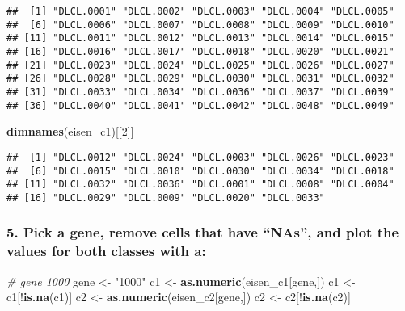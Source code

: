 \documentclass[]{article}
\newenvironment{Shaded}{\begin{snugshade}}{\end{snugshade}}
\newcommand{\KeywordTok}[1]{\textcolor[rgb]{0.13,0.29,0.53}{\textbf{{#1}}}}
\newcommand{\DecValTok}[1]{\textcolor[rgb]{0.00,0.00,0.81}{{#1}}}
\newcommand{\StringTok}[1]{\textcolor[rgb]{0.31,0.60,0.02}{{#1}}}
\newcommand{\CommentTok}[1]{\textcolor[rgb]{0.56,0.35,0.01}{\textit{{#1}}}}
\newcommand{\NormalTok}[1]{{#1}}
\begin{document}
\begin{verbatim}
##  [1] "DLCL.0001" "DLCL.0002" "DLCL.0003" "DLCL.0004" "DLCL.0005"
##  [6] "DLCL.0006" "DLCL.0007" "DLCL.0008" "DLCL.0009" "DLCL.0010"
## [11] "DLCL.0011" "DLCL.0012" "DLCL.0013" "DLCL.0014" "DLCL.0015"
## [16] "DLCL.0016" "DLCL.0017" "DLCL.0018" "DLCL.0020" "DLCL.0021"
## [21] "DLCL.0023" "DLCL.0024" "DLCL.0025" "DLCL.0026" "DLCL.0027"
## [26] "DLCL.0028" "DLCL.0029" "DLCL.0030" "DLCL.0031" "DLCL.0032"
## [31] "DLCL.0033" "DLCL.0034" "DLCL.0036" "DLCL.0037" "DLCL.0039"
## [36] "DLCL.0040" "DLCL.0041" "DLCL.0042" "DLCL.0048" "DLCL.0049"
\end{verbatim}

\begin{Shaded}
\begin{Highlighting}[]
\KeywordTok{dimnames}\NormalTok{(eisen_c1)[[}\DecValTok{2}\NormalTok{]]}
\end{Highlighting}
\end{Shaded}

\begin{verbatim}
##  [1] "DLCL.0012" "DLCL.0024" "DLCL.0003" "DLCL.0026" "DLCL.0023"
##  [6] "DLCL.0015" "DLCL.0010" "DLCL.0030" "DLCL.0034" "DLCL.0018"
## [11] "DLCL.0032" "DLCL.0036" "DLCL.0001" "DLCL.0008" "DLCL.0004"
## [16] "DLCL.0029" "DLCL.0009" "DLCL.0020" "DLCL.0033"
\end{verbatim}

\subsubsection{\texorpdfstring{5. Pick a gene, remove cells that have
``NAs'', and plot the values for both classes with
a:}{5. Pick a gene, remove cells that have NAs, and plot the values for both classes with a:}}\label{pick-a-gene-remove-cells-that-have-nas-and-plot-the-values-for-both-classes-with-a}

\begin{Shaded}
\begin{Highlighting}[]
\CommentTok{# gene 1000}
\NormalTok{gene <-}\StringTok{ "1000"}
\NormalTok{c1 <-}\StringTok{ }\KeywordTok{as.numeric}\NormalTok{(eisen_c1[gene,])}
\NormalTok{c1 <-}\StringTok{ }\NormalTok{c1[!}\KeywordTok{is.na}\NormalTok{(c1)]}
\NormalTok{c2 <-}\StringTok{ }\KeywordTok{as.numeric}\NormalTok{(eisen_c2[gene,])}
\NormalTok{c2 <-}\StringTok{ }\NormalTok{c2[!}\KeywordTok{is.na}\NormalTok{(c2)]}
\end{Highlighting}
\end{Shaded}
\end{document}
